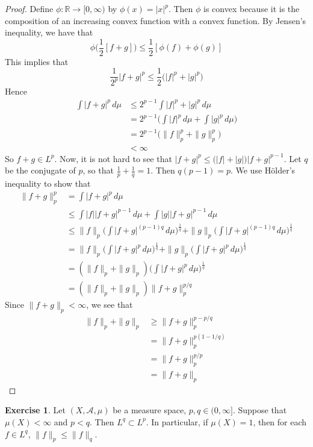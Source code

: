 \documentclass[12pt]{amsart}
\theoremstyle{definition}
\newtheorem{ex}[definition]{Exercise}
\newcommand{\R}{\mathbb{R}}
\newcommand{\MA}{\mathcal{A}}
\newcommand{\dmu}{\, d \mu}
\newcommand{\Rg}{[0,\infty)}
\newcommand{\lex}[1]{\label{ex:#1}}
\begin{document}
	\begin{proof}
		Define $\phi:\R \rightarrow \Rg$ by $\phi(x) = | x |^p$. Then $\phi$ is convex because it is the composition of an increasing convex function with a convex function. By Jensen's inequality, we have that $$\phi\bigg(\frac{1}{2}[f+g] \bigg) \leq \frac{1}{2}[\phi(f)+\phi(g)]$$ 
		This implies that $$\frac{1}{2^p} | f+g|^p \leq \frac{1}{2}\bigg(| f|^p +| g |^p\bigg)$$ 
		Hence 
		\begin{align*}
			\int| f + g|^p \dmu 
			& \leq 2^{p-1}\int | f|^p +| g|^p \dmu \\
			& = 2^{p-1}\bigg(\int | f|^p \dmu + \int | g|^p \dmu \bigg) \\
			&= 2^{p-1}\bigg( \|f \|_p^p + \|g \|_p^p\bigg) \\
			& < \infty
		\end{align*}
		So $f+g \in L^p$. Now, it is not hard to see that $|f+g|^p \leq \big( |f| + |g| \big)|f+g|^{p-1}$. Let $q$ be the conjugate of $p$, so that $\frac{1}{p} + \frac{1}{q} = 1$. Then $q(p-1) = p$. We use Hölder's inequality to show that 
		\begin{align*}
			\|f+g \|_p ^p
			&= \int  |f+g|^p \dmu \\
			& \leq \int |f| |f+g|^{p-1} \dmu + \int |g| |f+g|^{p-1} \dmu \\
			& \leq \|f\|_p \bigg(\int |f+g|^{(p-1)q} \dmu\bigg)^{\frac{1}{q}} + \|g\|_p \bigg(\int |f+g|^{(p-1)q}\dmu\bigg)^{\frac{1}{q}} \\
			&= \|f\|_p \bigg(\int |f+g|^{p} \dmu\bigg)^{\frac{1}{q}} + \|g\|_p \bigg(\int |f+g|^{p}\dmu\bigg)^{\frac{1}{q}} \\ 
			&= (\|f\|_p + \|g \|_p) \bigg(\int |f+g|^{p} \dmu\bigg)^{\frac{1}{q}}\\
			&= (\|f \|_p + \|g \|_p) \|f+g \|_p^{p/q}
		\end{align*}
		Since $\|f+g \|_p < \infty$, we see that
		\begin{align*}
			\|f \|_p + \|g \|_p 
			& \geq \|f+g \|_p ^{p - p/q} \\
			&=  \|f+g \|_p ^{p(1 - 1/q)} \\
			&= \|f+g \|_p ^{p/p} \\
			&= \|f+g \|_p
		\end{align*}
	\end{proof}
	
	\begin{ex} \lex{00000} 
		Let $(X, \MA, \mu)$ be a measure space, $p,q \in (0, \infty]$. Suppose that $\mu(X) < \infty$ and $p < q$. Then $L^q \subset L^p$. In particular, if $\mu(X) = 1$, then for each $f \in L^q$, $\|f\|_p \leq \|f\|_q$.
	\end{ex}
	
\end{document}
